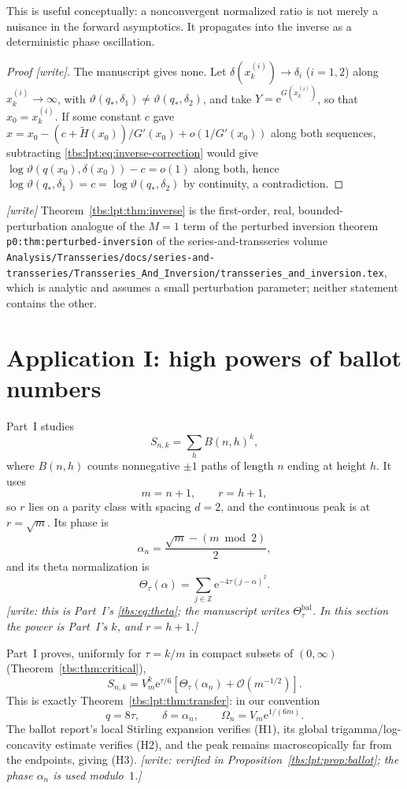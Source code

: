 \documentclass[11pt,a4paper]{article}
\numberwithin{equation}{section}
\theoremstyle{definition}
\newcommand{\Z}{\mathbb Z}
\newcommand{\ee}{\mathrm e}
\newcommand{\OO}{\mathcal O}
\newcommand{\code}[1]{\texttt{#1}}
\begin{document}
This is useful conceptually: a nonconvergent normalized ratio is not
merely a nuisance in the forward asymptotics. It propagates into the
inverse as a deterministic phase oscillation.

\begin{proof}[Proof {[write]}]
The manuscript gives none. Let $\delta(x^{(i)}_k)\to\delta_i$ ($i=1,2$)
along $x^{(i)}_k\to\infty$, with
$\vartheta(q_*,\delta_1)\ne\vartheta(q_*,\delta_2)$, and take
$Y=\ee^{G(x^{(i)}_k)}$, so that $x_0=x^{(i)}_k$. If some constant $c$
gave $x=x_0-(c+\tilde H(x_0))/G'(x_0)+o(1/G'(x_0))$ along both
sequences, subtracting \eqref{tbs:lpt:eq:inverse-correction} would give
$\log\vartheta(q(x_0),\delta(x_0))-c=o(1)$ along both, hence
$\log\vartheta(q_*,\delta_1)=c=\log\vartheta(q_*,\delta_2)$ by continuity,
a contradiction.
\end{proof}

\emph{[write]} Theorem~\ref{tbs:lpt:thm:inverse} is the first-order,
real, bounded-perturbation analogue of the $M=1$ term of the perturbed
inversion theorem \code{p0:thm:perturbed-inversion} of the
series-and-transseries volume
\nolinkurl{Analysis/Transseries/docs/series-and-transseries/Transseries_And_Inversion/transseries_and_inversion.tex},
which is analytic and assumes a small perturbation parameter; neither
statement contains the other.

\section{Application I: high powers of ballot numbers}\label{tbs:lpt:sec:ballot}

Part~I studies
\[
 S_{n,k}=\sum_h B(n,h)^k,
\]
where $B(n,h)$ counts nonnegative $\pm1$ paths of length $n$ ending at
height $h$. It uses
\[
 m=n+1,\qquad r=h+1,
\]
so $r$ lies on a parity class with spacing $d=2$, and the continuous peak
is at $r=\sqrt m$. Its phase is
\begin{equation}\label{tbs:lpt:eq:ballot-phase}
 \alpha_n=\frac{\sqrt m-(m\bmod2)}{2},
\end{equation}
and its theta normalization is
\begin{equation}\label{tbs:lpt:eq:ballot-theta}
 \Theta_\tau(\alpha)
 =\sum_{j\in\Z}\ee^{-4\tau(j-\alpha)^2}.
\end{equation}
\emph{[write: this is Part~I's \eqref{tbs:eq:theta}; the manuscript writes
$\Theta^{\mathrm{bal}}_\tau$. In this section the power is Part~I's $k$,
and $r=h+1$.]}

Part~I proves, uniformly for $\tau=k/m$ in compact subsets of
$(0,\infty)$ (Theorem~\ref{tbs:thm:critical}),
\begin{equation}\label{tbs:lpt:eq:ballot-known}
 S_{n,k}=V_m^k\ee^{\tau/6}
 \left[\Theta_\tau(\alpha_n)+\OO(m^{-1/2})\right].
\end{equation}
This is exactly Theorem~\ref{tbs:lpt:thm:transfer}: in our convention
\[
 q=8\tau,\qquad \delta=\alpha_n,\qquad
 \Omega_n=V_m\ee^{1/(6m)}.
\]
The ballot report's local Stirling expansion verifies (H1), its global
trigamma/log-concavity estimate verifies (H2), and the peak remains
macroscopically far from the endpoints, giving (H3).
\emph{[write: verified in Proposition~\ref{tbs:lpt:prop:ballot}; the
phase $\alpha_n$ is used modulo~$1$.]}
\end{document}
